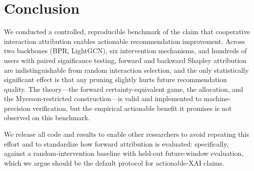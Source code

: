 \documentclass[pdflatex,sn-mathphys-num]{sn-jnl}%
\theoremstyle{thmstyleone}%
\theoremstyle{thmstyletwo}%
\theoremstyle{thmstylethree}%
\newcommand{\CAV}{\mathrm{CAV}}
\begin{document}
\section{Conclusion}\label{sec6}

We conducted a controlled, reproducible benchmark of the claim that cooperative interaction attribution enables actionable recommendation improvement. Across two backbones (BPR, LightGCN), six intervention mechanisms, and hundreds of users with paired significance testing, forward and backward Shapley attribution are indistinguishable from random interaction selection, and the only statistically significant effect is that any pruning slightly hurts future recommendation quality. The theory---the forward certainty-equivalent game, the \CAV{} allocation, and the Myerson-restricted construction---is valid and implemented to machine-precision verification, but the empirical actionable benefit it promises is not observed on this benchmark.

We release all code and results to enable other researchers to avoid repeating this effort and to standardize how forward attribution is evaluated: specifically, against a random-intervention baseline with held-out future-window evaluation, which we argue should be the default protocol for actionable-XAI claims.

\backmatter
\end{document}
